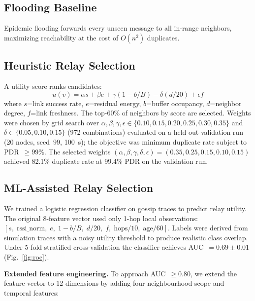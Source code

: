 \documentclass[conference]{IEEEtran}
\begin{document}
\subsection{Flooding Baseline}
Epidemic flooding forwards every unseen message to all in-range neighbors,
maximizing reachability at the cost of $O(n^2)$ duplicates.

\subsection{Heuristic Relay Selection}
A utility score ranks candidates:
\begin{equation}\label{eq:heuristic}
  u(v)=\alpha s+\beta e+\gamma(1-b/B)-\delta(d/20)+\epsilon f
\end{equation}
where $s$=link success rate, $e$=residual energy, $b$=buffer occupancy,
$d$=neighbor degree, $f$=link freshness.  The top-60\% of neighbors by score
are selected.  Weights were chosen by grid search over
$\alpha,\beta,\gamma,\epsilon\in\{0.10,0.15,0.20,0.25,0.30,0.35\}$ and
$\delta\in\{0.05,0.10,0.15\}$ (972 combinations) evaluated on a held-out
validation run (20 nodes, seed~99, 100~s); the objective was minimum duplicate
rate subject to PDR~$\geq99\%$.  The selected weights
$(\alpha,\beta,\gamma,\delta,\epsilon)=(0.35,0.25,0.15,0.10,0.15)$ achieved
82.1\% duplicate rate at 99.4\% PDR on the validation run.

\subsection{ML-Assisted Relay Selection}
\label{ssec:ml}
We trained a logistic regression classifier on gossip traces to predict relay utility.
The original 8-feature vector used only 1-hop local observations:
$[s,\;\mathrm{rssi\_norm},\;e,\;1-b/B,\;d/20,\;f,\;\mathrm{hops}/10,\;\mathrm{age}/60]$.
Labels were derived from simulation traces with a noisy utility threshold to
produce realistic class overlap.  Under 5-fold stratified cross-validation the
classifier achieves AUC~$=0.69\pm0.01$ (Fig.~\ref{fig:roc}).

\textbf{Extended feature engineering.}  To approach AUC~$\geq 0.80$, we extend
the feature vector to 12 dimensions by adding four neighbourhood-scope and
temporal features:
\end{document}

